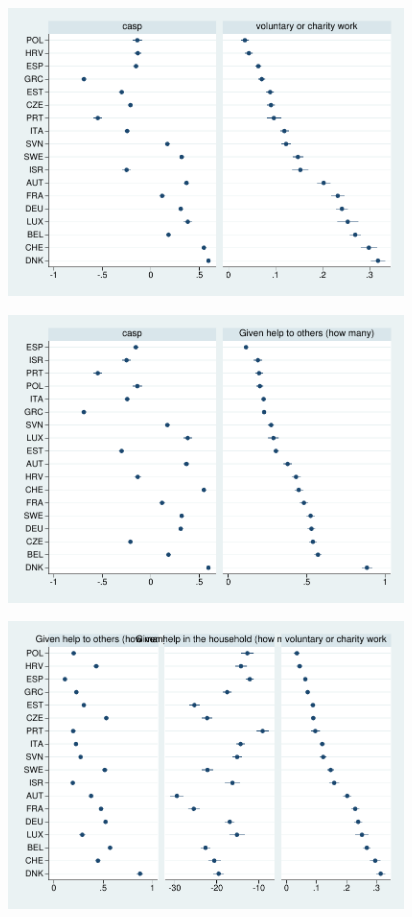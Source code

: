 \documentclass[10pt, letterpaper]{article}
\begin{document}
\begin{spacing}{1.4}
\begin{figure}[H]
 \includegraphics[height=3in]{tmp/casp-volCha-means.pdf}\centering\label{casp-volCha-means}
\caption{}
\end{figure}


\begin{figure}[H]
 \includegraphics[height=3in]{tmp/casp-ghto-means.pdf}\centering\label{casp-ghto-means}
\caption{}
\end{figure}

\begin{figure}[H]
 \includegraphics[height=3in]{tmp/ghto-ghih-volCha-means.pdf}\centering\label{ghto-ghih-volCha-means}
\caption{}
\end{figure}




\end{spacing}
\end{document}
